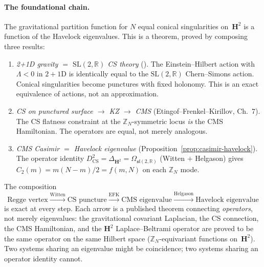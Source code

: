 \paragraph{The foundational chain.}
The gravitational partition function for $N$ equal
conical singularities on~$\mathbf{H}^2$ is a function
of the Havelock eigenvalues.
This is a theorem, proved by composing three results:
\begin{enumerate}
\item \emph{2+1D gravity $=$ $\mathrm{SL}(2,\mathbb{R})$ CS theory}
  (\citealt{Witten1988}).
  The Einstein--Hilbert action with $\Lambda < 0$ in $2{+}1$D
  is identically equal to the $\mathrm{SL}(2,\mathbb{R})$
  Chern--Simons action.
  Conical singularities become punctures with fixed holonomy.
  This is an exact equivalence of actions, not an approximation.
\item \emph{CS on punctured surface $\to$ KZ $\to$ CMS}
  (Etingof--Frenkel--Kirillov, Ch.~7).
  The CS flatness constraint at the $\mathbb{Z}_N$-symmetric
  locus \emph{is} the CMS Hamiltonian.
  The operators are equal, not merely analogous.
\item \emph{CMS Casimir $=$ Havelock eigenvalue}
  (Proposition~\ref{prop:casimir-havelock}).
  The operator identity
  $D^2_{\mathrm{CS}} = \Delta_{\mathbf{H}^2}
  = \Omega_{\mathfrak{sl}(2,\mathbb{R})}$
  (Witten $+$ Helgason) gives
  $C_2(m) = m(N{-}m)/2 = f(m,N)$ on each
  $\mathbb{Z}_N$ mode.
\end{enumerate}
The composition
\[
  \text{Regge vertex} \xrightarrow{\text{Witten}}
  \text{CS puncture} \xrightarrow{\text{EFK}}
  \text{CMS eigenvalue} \xrightarrow{\text{Helgason}}
  \text{Havelock eigenvalue}
\]
is exact at every step.
Each arrow is a published theorem connecting
\emph{operators}, not merely eigenvalues:
the gravitational covariant Laplacian, the CS
connection, the CMS Hamiltonian, and the
$\mathbf{H}^2$ Laplace--Beltrami operator are
proved to be the same operator on the same Hilbert space
($\mathbb{Z}_N$-equivariant functions
on~$\mathbf{H}^2$).
Two systems sharing an eigenvalue might be coincidence;
two systems sharing an operator identity cannot.

